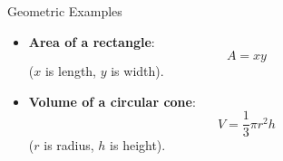 \documentclass[aspectratio=169,10pt]{beamer}
\begin{document}
\begin{frame}{Geometric Examples}
    \begin{itemize}
        \item \textbf{Area of a rectangle}:
        \[
            A = xy
        \]
        ($x$ is length, $y$ is width).
        
        \vspace{0.4cm}
        
        \item \textbf{Volume of a circular cone}:
        \[
            V = \frac{1}{3}\pi r^2 h
        \]
        ($r$ is radius, $h$ is height).
    \end{itemize}
\end{frame}
\end{document}
